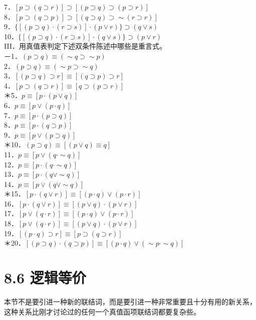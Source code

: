 7．$[p \supset(q \supset r)] \supset[(p \supset q) \supset(p \supset r)]$\\
8．$[p \supset(q \supset p)] \supset[(q \supset q) \supset \sim(r \supset r)]$\\
9．$\{[(p \supset q) \cdot(r \supset s)] \cdot(p \vee r)\} \supset(q \vee s)$\\
10．$\{[(p \supset q) \cdot(r \supset s)] \cdot(q \vee s)\} \supset(p \vee r)$\\
III．用真值表判定下述双条件陈述中哪些是重言式。\\
－1．$(p \supset q) \equiv(\sim q \supset \sim p)$\\
2．$(p \supset q) \equiv(\sim p \supset \sim q)$\\
3．$[(p \supset q) \supset r] \equiv[(q \supset p) \supset r]$\\
4．$[p \supset(q \supset r)] \equiv[q \supset(p \supset r)]$\\
＊5．$p \equiv[p \cdot(p \vee q)]$\\
6．$p \equiv[p \vee(p \cdot q)]$\\
7．$p \equiv[p \cdot(p \supset q)]$\\
8．$p \equiv[p \cdot(q \supset p)]$\\
9．$p \equiv[p \vee(p \supset q)]$\\
＊10．$(p \supset q) \equiv[(p \vee q) \equiv q]$\\
11．$p \equiv[p \vee(q \cdot \sim q)]$\\
12．$p \equiv[p \cdot(q \cdot \sim q)]$\\
13．$p \equiv[p \cdot(q \vee \sim q)]$\\
14．$p \equiv[p \vee(q \vee \sim q)]$\\
＊15．$[p \cdot(q \vee r)] \equiv[(p \cdot q) \vee(p \cdot r)]$\\
16．$[p \cdot(q \vee r)] \equiv[(p \vee q) \cdot(p \vee r)]$\\
17．$[p \vee(q \cdot r)] \equiv[(p \cdot q) \vee(p \cdot r)]$\\
18．$[p \vee(q \cdot r)] \equiv[(p \vee q) \cdot(p \vee r)]$\\
19．$[(p \cdot q) \supset r] \equiv[p \supset(q \supset r)]$\\
＊20．$[(p \supset q) \cdot(q \supset p)] \equiv[(p \cdot q) \vee(\sim p \cdot \sim q)]$

\section*{8.6 逻辑等价}
本节不是要引进一种新的联结词，而是要引进一种非常重要且十分有用的新关系，这种关系比刚才讨论过的任何一个真值函项联结词都要复杂些。

